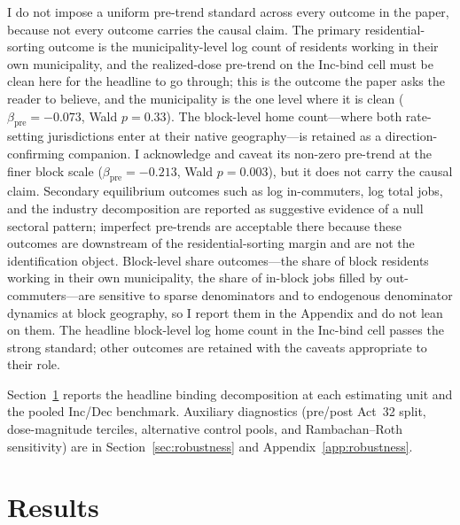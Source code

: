\documentclass[12pt]{article}
\begin{document}
I do not impose a uniform pre-trend standard across every outcome
in the paper, because not every outcome carries the causal claim.
The primary residential-sorting outcome is the municipality-level log
count of residents working in their own municipality, and the
realized-dose pre-trend on the Inc-bind cell must be clean here for the
headline to go through; this is the outcome the paper asks the reader to
believe, and the municipality is the one level where it is clean
($\beta_{\text{pre}} = -0.073$, Wald $p=0.33$). The block-level home
count---where both rate-setting jurisdictions enter at their native
geography---is retained as a direction-confirming companion. I
acknowledge and caveat its non-zero pre-trend at the finer block scale
($\beta_{\text{pre}} = -0.213$, Wald $p=0.003$), but it does not carry
the causal claim. Secondary equilibrium
outcomes such as log in-commuters, log total jobs, and the industry
decomposition are reported as suggestive evidence of a
null sectoral pattern; imperfect pre-trends are acceptable
there because these outcomes are downstream of the
residential-sorting margin and are not the identification object.
Block-level share outcomes---the share of block residents working
in their own municipality, the share of in-block jobs filled by
out-commuters---are sensitive to sparse denominators and to
endogenous denominator dynamics at block geography, so I report
them in the Appendix and do not lean on them. The headline
block-level log home count in the Inc-bind cell passes the strong
standard; other outcomes are retained with the caveats appropriate
to their role.

Section~\ref{sec:results} reports the headline binding
decomposition at each estimating unit and the pooled Inc/Dec
benchmark. Auxiliary diagnostics (pre/post Act~32 split, dose-magnitude
terciles, alternative control pools, and Rambachan--Roth
sensitivity) are in Section~\ref{sec:robustness} and
Appendix~\ref{app:robustness}.


\section{Results}
\label{sec:results}
\end{document}
